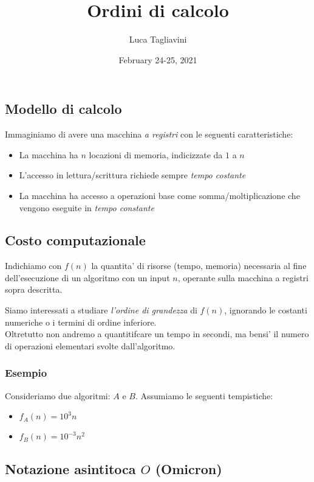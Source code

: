 \documentclass{article}
\title{\textbf{Ordini di calcolo}}
\author{Luca Tagliavini}
\date{February 24-25, 2021}
\begin{document}
\maketitle
\tableofcontents
\pagebreak

\subsection{Modello di calcolo}

Immaginiamo di avere una macchina \emph{a registri} con le seguenti caratteristiche:
\begin{itemize}
  \item La macchina ha $n$ locazioni di memoria, indicizzate da $1$ a $n$
  \item L'accesso in lettura/scrittura richiede sempre \emph{tempo costante}
  \item La macchina ha accesso a operazioni base come somma/moltiplicazione che
    vengono eseguite in \emph{tempo constante}
\end{itemize}

\subsection{Costo computazionale}

Indichiamo con $f(n)$ la quantita' di risorse (tempo, memoria) necessaria al fine
dell'esecuzione di un algoritmo con un input $n$, operante sulla macchina a registri
sopra descritta.

Siamo interessati a studiare \emph{l'ordine di grandezza} di $f(n)$, ignorando
le costanti numeriche o i termini di ordine inferiore. \\
Oltretutto non andremo a quantitifcare un tempo in secondi, ma bensi' il numero
di operazioni elementari svolte dall'algoritmo.

\subsubsection{Esempio}

Consideriamo due algoritmi: $A$ e $B$. Assumiamo le seguenti tempistiche:
\begin{itemize}
  \item $f_A(n) = 10^3n$
  \item $f_B(n) = 10^{-3}n^2$
\end{itemize}

\subsection{Notazione asintitoca $O$ (Omicron)}
\end{document}
